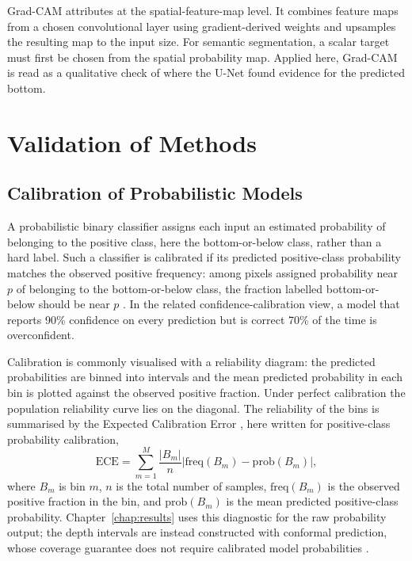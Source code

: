 Grad-CAM \cite{selvaraju_gradcam_2017} attributes at the spatial-feature-map level. It combines feature maps from a chosen convolutional layer using gradient-derived weights and upsamples the resulting map to the input size. For semantic segmentation, a scalar target must first be chosen from the spatial probability map. Applied here, Grad-CAM is read as a qualitative check of where the U-Net found evidence for the predicted bottom.




\section{Validation of Methods}

\subsection{Calibration of Probabilistic Models}

A probabilistic binary classifier assigns each input an estimated probability of belonging to the positive class, here the bottom-or-below class, rather than a hard label. Such a classifier is calibrated if its predicted positive-class probability matches the observed positive frequency: among pixels assigned probability near $p$ of belonging to the bottom-or-below class, the fraction labelled bottom-or-below should be near $p$ \cite{guo_calibration_2017}. In the related confidence-calibration view, a model that reports 90\% confidence on every prediction but is correct 70\% of the time is overconfident.

Calibration is commonly visualised with a reliability diagram: the predicted probabilities are binned into intervals and the mean predicted probability in each bin is plotted against the observed positive fraction. Under perfect calibration the population reliability curve lies on the diagonal. The reliability of the bins is summarised by the Expected Calibration Error \cite{naeini_obtaining_2015}, here written for positive-class probability calibration,
\begin{equation}
    \mathrm{ECE} = \sum_{m=1}^{M} \frac{|B_m|}{n} \left| \mathrm{freq}(B_m) - \mathrm{prob}(B_m) \right|,
\end{equation}
where $B_m$ is bin $m$, $n$ is the total number of samples, $\mathrm{freq}(B_m)$ is the observed positive fraction in the bin, and $\mathrm{prob}(B_m)$ is the mean predicted positive-class probability. Chapter~\ref{chap:results} uses this diagnostic for the raw probability output; the depth intervals are instead constructed with conformal prediction, whose coverage guarantee does not require calibrated model probabilities \cite{angelopoulos_gentle_2023}.

